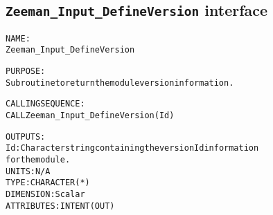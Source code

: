 \subsection{\texttt{Zeeman\_Input\_DefineVersion} interface}
  \label{sec:Zeeman_Input_DefineVersion_interface}
  \begin{alltt}
 
  NAME:
        Zeeman_Input_DefineVersion
 
  PURPOSE:
        Subroutine to return the module version information.
 
  CALLING SEQUENCE:
        CALL Zeeman_Input_DefineVersion( Id )
 
  OUTPUTS:
        Id:            Character string containing the version Id information
                       for the module.
                       UNITS:      N/A
                       TYPE:       CHARACTER(*)
                       DIMENSION:  Scalar
                       ATTRIBUTES: INTENT(OUT)
 
  \end{alltt}
